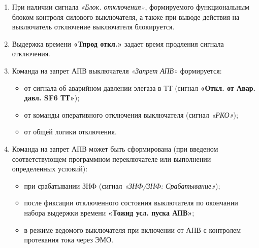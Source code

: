 \begin{enumerate}
\item
При наличии сигнала \textit{«Блок. отключения»}, формируемого функциональным блоком контроля силового
выключателя, а также при выводе действия на выключатель отключение выключателя блокируется.

\item
Выдержка времени \textbf{«Тпрод откл.»} задает время продления сигнала отключения. 

\item
Команда на запрет АПВ выключателя \textit{«Запрет АПВ»} формируется:
\begin{itemize}
    \item от сигнала об аварийном давлении элегаза в ТТ (сигнал \textbf{«Откл. от Авар. давл. SF6 ТТ»});
    \item от команды оперативного отключения выключателя (сигнал \textit{«РКО»});
    \item от общей логики отключения.
\end{itemize}

\item
Команда на запрет АПВ может быть сформирована (при введеном соответствующем программном переключателе или выполнении определенных условий):
\begin{itemize}
    \item при срабатывании ЗНФ (сигнал \textit{«ЗНФ/ЗНФ: Срабатывание»});
    \item после фиксации отключенного состояния выключателя по окончании набора выдержки времени \textbf{«Тожид усл. пуска АПВ»};
    \item в режиме ведомого выключателя при включении от АПВ с контролем протекания тока через ЭМО.
\end{itemize}

\end{enumerate}